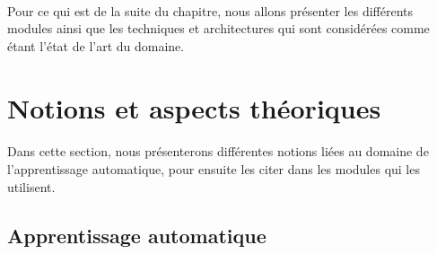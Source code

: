 \paragraph{}
Pour ce qui est de la suite du chapitre, nous allons présenter les différents modules ainsi que les techniques et architectures qui sont considérées comme étant l'état de l'art du domaine. 

\section{Notions et aspects théoriques}
\paragraph{}
Dans cette section, nous présenterons différentes notions liées au domaine de l'apprentissage automatique, pour ensuite les citer dans les modules qui les utilisent. 
\subsection{Apprentissage automatique}
